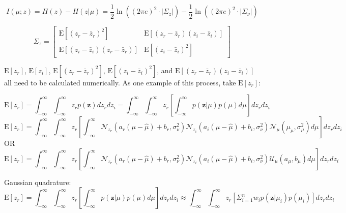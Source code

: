 \documentclass{article}         %
\theoremstyle{definition}
\theoremstyle{remark}
\newcommand{\eq}[1]{\begin{equation} #1 \end{equation}}
\newcommand{\zbf}{\mathbf{z}}
\newcommand{\zcond}{\mathbf{z}|\mu}
\newcommand{\Nscript}{\mathcal{N}}
\newcommand{\paren}[1]{\left(#1\right)}
\newcommand{\bracket}[1]{\left[#1\right]}
\newcommand{\expect}[1]{\mathrm{E}\left[#1\right]}
\begin{document}
\begin{equation}
	I\left(\mu;z\right) = H\left(z\right) - H\left(z|\mu\right) 
	= \frac{1}{2}\ln\left(\left(2\pi e\right)^2\cdot\lvert\Sigma_z\rvert\right) - \frac{1}{2}\ln\left(\left(2\pi e\right)^2\cdot\lvert\Sigma_\nu\rvert\right)
\end{equation}

\begin{equation}
	\Sigma_z = \left[ \begin{array}{cc}
	\mathrm{E}\left[\left(z_r - \bar{z}_r\right)^2\right] & \mathrm{E}\left[\left(z_r - \bar{z}_r\right)\left(z_i - \bar{z}_i\right)\right] \\
	\mathrm{E}\left[\left(z_i - \bar{z}_i\right)\left(z_r - \bar{z}_r\right)\right] & \mathrm{E}\left[\left(z_i - \bar{z}_i\right)^2\right] \end{array} \right]
\end{equation}

$\expect{z_r}$, $\expect{z_i}$, $\expect{\left(z_r - \bar{z}_r\right)^2}$, $\expect{\left(z_i - \bar{z}_i\right)^2}$, and $\expect{\left(z_r - \bar{z}_r\right)\left(z_i - \bar{z}_i\right)}$ all need to be calculated numerically. As one example of this process, take $\expect{z_r}$:

\eq{\expect{z_r} = \int_{-\infty}^\infty\int_{-\infty}^\infty z_r p\paren{\zbf}dz_rdz_i = \int_{-\infty}^\infty\int_{-\infty}^\infty z_r \bracket{\int_{-\infty}^\infty p\paren{\zcond}p\paren{\mu}d\mu}dz_rdz_i}
\eq{\expect{z_r} = \int_{-\infty}^\infty\int_{-\infty}^\infty z_r \bracket{\int_{-\infty}^\infty \Nscript_{z_r}\paren{a_r\paren{\mu - \hat{\mu}} + b_r,\sigma_\nu^2}\Nscript_{z_i}\paren{a_i\paren{\mu - \hat{\mu}} + b_i,\sigma_\nu^2}\Nscript_\mu\paren{\mu_\mu,\sigma_\mu^2} d\mu}dz_rdz_i}
OR
\eq{\expect{z_r} = \int_{-\infty}^\infty\int_{-\infty}^\infty z_r \bracket{\int_{-\infty}^\infty \Nscript_{z_r}\paren{a_r\paren{\mu - \hat{\mu}} + b_r,\sigma_\nu^2}\Nscript_{z_i}\paren{a_i\paren{\mu - \hat{\mu}} + b_i,\sigma_\nu^2}\mathcal{U}_\mu\paren{a_\mu,b_\mu} d\mu}dz_rdz_i}

Gaussian quadrature:
\eq{\expect{z_r} = \int_{-\infty}^\infty\int_{-\infty}^\infty z_r \bracket{\int_{-\infty}^\infty p\paren{\zcond}p\paren{\mu}d\mu}dz_rdz_i \approx \int_{-\infty}^\infty\int_{-\infty}^\infty z_r \bracket{\Sigma_{i=1}^n w_i p\paren{\zbf|\mu_i}p\paren{\mu_i}}dz_rdz_i} 
\end{document}
